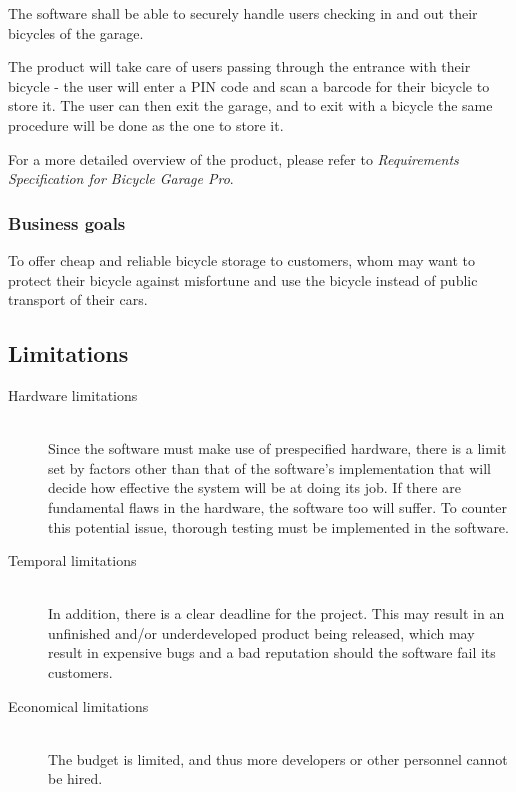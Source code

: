 \documentclass[12pt,titlepage]{article}
\begin{document}
The software shall be able to securely handle users checking in and out their
bicycles of the garage. 

The product will take care of users passing through the entrance with their
bicycle - the user will enter a PIN code and scan a barcode for their bicycle to
store it. The user can then exit the garage, and to exit with a bicycle the same
procedure will be done as the one to store it.

For a more detailed overview of the product, please refer to
\textit{Requirements Specification for Bicycle Garage Pro}.

\subsubsection{Business goals}

To offer cheap and reliable bicycle storage to customers, whom may want to
protect their bicycle against misfortune and use the bicycle instead of public
transport of their cars.

\subsection{Limitations}

\begin{description}
\item[Hardware limitations] \hfill \\ 
Since the software must make use of prespecified hardware, there is a limit set
by factors other than that of the software's implementation that will decide
how effective the system will be at doing its job. If there are fundamental
flaws in the hardware, the software too will suffer. To counter this potential
issue, thorough testing must be implemented in the software.

\item[Temporal limitations] \hfill \\
In addition, there is a clear deadline for the project. This may result in an
unfinished and/or underdeveloped product being released, which may result in
expensive bugs and a bad reputation should the software fail its customers.

\item[Economical limitations] \hfill \\
The budget is limited, and thus more developers or other personnel cannot be
hired.
\end{description}


\end{document}
